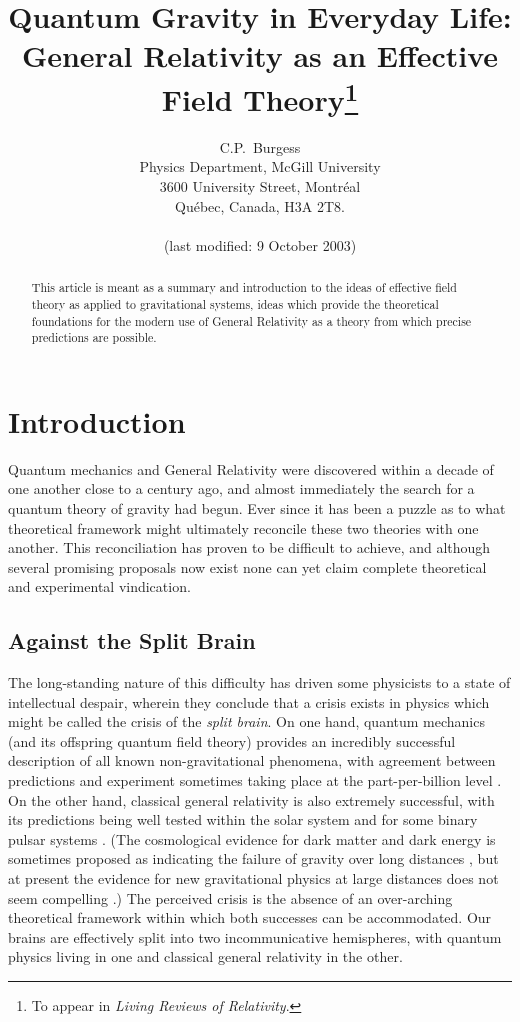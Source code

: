 \documentclass[12pt]{article}
\title{Quantum Gravity in Everyday Life:\\
General Relativity as an Effective Field Theory\footnote{To appear
in {\it Living Reviews of Relativity}.}}
\author{C.P.\ Burgess \\
        Physics Department, McGill University \\
        3600 University Street, Montr{\'e}al \\
        Qu{\'e}bec, Canada, H3A 2T8. \\
\\
\small{(last modified: 9 October 2003)} }
\date{}
\begin{document}
\maketitle

\begin{abstract}
This article is meant as a summary and introduction to
the ideas of effective field theory as applied to gravitational
systems, ideas which provide the theoretical foundations for the
modern use of General Relativity as a theory from which precise
predictions are possible.
\end{abstract}



\section{Introduction}
\label{section:introduction}
%
Quantum mechanics and General Relativity were discovered within a
decade of one another close to a century ago, and almost
immediately the search for a quantum theory of gravity had begun.
Ever since it has been a puzzle as to what theoretical framework
might ultimately reconcile these two theories with one another.
This reconciliation has proven to be difficult to achieve, and
although several promising proposals now exist none can yet claim
complete theoretical and experimental vindication.

\subsection{Against the Split Brain}
%
The long-standing nature of this difficulty has driven some
physicists to a state of intellectual despair, wherein they
conclude that a crisis exists in physics which might be called the
crisis of the \emph{split brain}. On one hand, quantum mechanics
(and its offspring quantum field theory) provides an incredibly
successful description of all known non-gravitational phenomena,
with agreement between predictions and experiment sometimes taking
place at the part-per-billion level \cite{QED,EWdata}. On the
other hand, classical general relativity is also extremely
successful, with its predictions being well tested within the
solar system and for some binary pulsar systems \cite{GRdata}.
(The cosmological evidence for dark matter and dark energy is
sometimes proposed as indicating the failure of gravity over long
distances \cite{MOND}, but at present the evidence for new
gravitational physics at large distances does not seem compelling
\cite{DMvsNP}.) The perceived crisis is the absence of an
over-arching theoretical framework within which both successes can
be accommodated. Our brains are effectively split into two
incommunicative hemispheres, with quantum physics living in one
and classical general relativity in the other.
\end{document}

